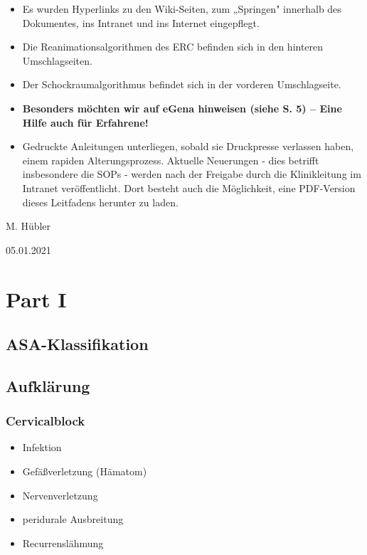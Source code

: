 \documentclass[
]{book}
\providecommand{\tightlist}{%
  \setlength{\itemsep}{0pt}\setlength{\parskip}{0pt}}
\begin{document}
\begin{itemize}
\item
  Es wurden Hyperlinks zu den Wiki-Seiten, zum „Springen" innerhalb des Dokumentes, ins Intranet und ins Internet eingepflegt.
\item
  Die Reanimationsalgorithmen des ERC befinden sich in den hinteren Umschlagseiten.
\item
  Der Schockraumalgorithmus befindet sich in der vorderen Umschlagseite.
\item
  \textbf{Besonders möchten wir auf eGena hinweisen (siehe S. 5) -- Eine Hilfe auch für Erfahrene!}
\item
  Gedruckte Anleitungen unterliegen, sobald sie Druckpresse verlassen haben, einem rapiden Alterungsprozess. Aktuelle Neuerungen - dies betrifft insbesondere die SOPs - werden nach der Freigabe durch die Klinikleitung im Intranet veröffentlicht. Dort besteht auch die Möglichkeit, eine PDF-Version dieses Leitfadens herunter zu laden.
\end{itemize}

M. Hübler

05.01.2021

\hypertarget{part-part-i}{%
\part{Part I}\label{part-part-i}}

\hypertarget{asa-klassifikation}{%
\chapter{ASA-Klassifikation}\label{asa-klassifikation}}

\hypertarget{aufkluxe4rung}{%
\chapter{Aufklärung}\label{aufkluxe4rung}}

\hypertarget{cervicalblock}{%
\section{Cervicalblock}\label{cervicalblock}}

\begin{itemize}
\tightlist
\item
  Infektion
\item
  Gefäßverletzung (Hämatom)
\item
  Nervenverletzung
\item
  peridurale Ausbreitung
\item
  Recurrenslähmung
\end{itemize}
\end{document}
